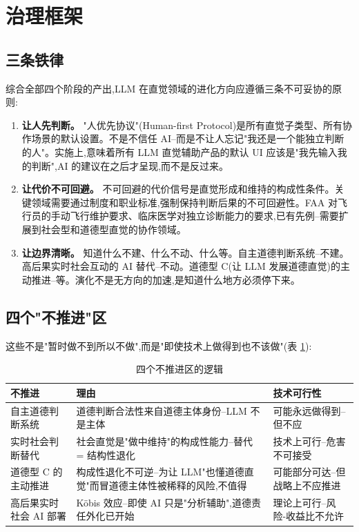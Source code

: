 \documentclass[11pt,a4paper]{article}
\begin{document}
\section{治理框架}

\subsection{三条铁律}

综合全部四个阶段的产出,LLM 在直觉领域的进化方向应遵循三条不可妥协的原则:

\begin{enumerate}[label=\textbf{铁律 \arabic*:},leftmargin=*]
  \item \textbf{让人先判断。} "人优先协议"(Human-first Protocol)是所有直觉子类型、所有协作场景的默认设置。不是不信任 AI--而是不让人忘记"我还是一个能独立判断的人"。实施上,意味着所有 LLM 直觉辅助产品的默认 UI 应该是"我先输入我的判断",AI 的建议在之后才呈现,而不是反过来。
  \item \textbf{让代价不可回避。} 不可回避的代价信号是直觉形成和维持的构成性条件。关键领域需要通过制度和职业标准,强制保持判断后果的不可回避性。FAA 对飞行员的手动飞行维护要求、临床医学对独立诊断能力的要求,已有先例--需要扩展到社会型和道德型直觉的协作领域。
  \item \textbf{让边界清晰。} 知道什么不建、什么不动、什么等。自主道德判断系统--不建。高后果实时社会互动的 AI 替代--不动。道德型 C(让 LLM 发展道德直觉)的主动推进--等。演化不是无方向的加速,是知道什么地方必须停下来。
\end{enumerate}

\subsection{四个"不推进"区}

这些不是"暂时做不到所以不做",而是"即使技术上做得到也不该做"(表 \ref{tab:nogo}):

\begin{table}[htbp]
  \centering
  \caption{四个不推进区的逻辑}
  \label{tab:nogo}
  \begin{tabular}{p{3cm}p{6cm}p{3cm}}
    \toprule
    \textbf{不推进} & \textbf{理由} & \textbf{技术可行性} \\
    \midrule
    自主道德判断系统 & 道德判断合法性来自道德主体身份--LLM 不是主体 & 可能永远做得到--但不应 \\
    \hline
    实时社会判断替代 & 社会直觉是"做中维持"的构成性能力--替代 = 结构性退化 & 技术上可行--危害不可接受 \\
    \hline
    道德型 C 的主动推进 & 构成性退化不可逆--为让 LLM"也懂道德直觉"而冒道德主体性被稀释的风险,不值得 & 可能部分可达--但战略上不应推进 \\
    \hline
    高后果实时社会 AI 部署 & Köbis 效应--即使 AI 只是"分析辅助",道德责任外化已开始 & 理论上可行--风险-收益比不允许 \\
    \bottomrule
  \end{tabular}
\end{table}
\end{document}
